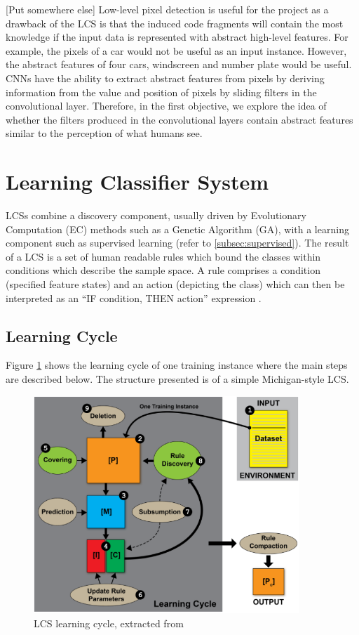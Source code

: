 [Put somewhere else]
Low-level pixel detection is useful for the project as a drawback of the LCS is that the induced code fragments will contain the most knowledge if the input data is represented with abstract high-level features. For example, the pixels of a car would not be useful as an input instance. However, the abstract features of four cars, windscreen and number plate would be useful. CNNs have the ability to extract abstract features from pixels by deriving information from the value and  position of pixels by sliding filters in the convolutional layer. Therefore, in the first objective, we explore the idea of whether the filters produced in the convolutional layers contain abstract features similar to the perception of what humans see.


\section{Learning Classifier System}
LCSs combine a discovery component, usually driven by Evolutionary Computation (EC) methods such as a Genetic Algorithm (GA), with a learning component \cite{urbanowicz2017introduction} such as supervised learning (refer to \ref{subsec:supervised}). The result of a LCS is a set of human readable rules which bound the classes within conditions which describe the sample space. A rule comprises a condition (specified feature states) and an action (depicting the class) which can then be interpreted as an ``IF condition, THEN action'' expression \cite{urbanowicz2017introduction}.

\subsection{Learning Cycle}

Figure \ref{fig:learningCycle} shows the learning cycle of one training instance where the main steps are described below. The structure presented is of a simple Michigan-style LCS.
\begin{figure}
	\begin{center}
		\includegraphics[width=100mm, scale=0.5]{LCScycle.png}
		\caption{LCS learning cycle, extracted from \cite{urbanowicz2017introduction}}
		\label{fig:learningCycle}
	\end{center}
\end{figure}


